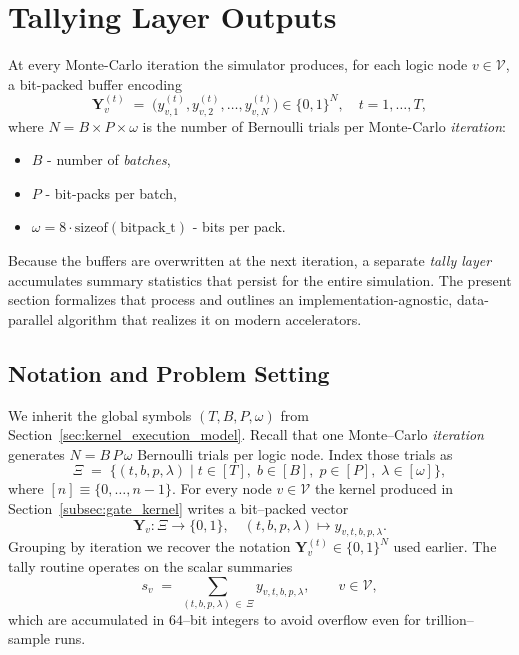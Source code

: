 \chapter{Tallying Layer Outputs}
\label{sec:tally_kernel}

At every Monte-Carlo iteration the simulator produces, for each logic node
\(v\in \mathcal{V}\), a bit-packed buffer encoding
\[
  \mathbf{Y}_v^{(t)}
  \;=\;
  \bigl(y_{v,1}^{(t)}, y_{v,2}^{(t)},\dots, y_{v,N}^{(t)}\bigr)
  \in\{0,1\}^N,
  \quad t = 1,\dots,T,
\]
where \(N\!=\!B\!\times\!P\!\times\!\omega\) is the number of Bernoulli trials
per Monte-Carlo \emph{iteration}:
\begin{itemize}
    \item \(B\) - number of \emph{batches},
    \item \(P\) - bit-packs per batch,
    \item \(\omega\!=\!8\cdot\mathrm{sizeof}(\text{bitpack\_t})\) - bits per pack.
\end{itemize}
Because the buffers are overwritten at the next iteration, a
separate \emph{tally layer} accumulates summary statistics that persist for the
entire simulation.  The present section formalizes that process and outlines
an implementation-agnostic, data-parallel algorithm that realizes it on modern
accelerators.

\section{Notation and Problem Setting}
\label{subsec:tally_notation}

We inherit the global symbols $(T,B,P,\omega)$ from
Section~\ref{sec:kernel_execution_model}.  Recall that one Monte--Carlo
\emph{iteration} generates $N\!=\!B\,P\,\omega$ Bernoulli trials per logic
node.  Index those trials as
\[
  \Xi \;=\; \bigl\{(t,b,p,\lambda) \mid t\!\in\![T],\; b\!\in\![B],\;
      p\!\in\![P],\; \lambda\!\in\![\omega]\bigr\},
\]
where $[n]\equiv\{0,\dots,n-1\}$.  For every node $v\in\mathcal{V}$ the
kernel produced in Section~\ref{subsec:gate_kernel} writes a bit--packed
vector
\[
  \mathbf{Y}_v : \Xi\longrightarrow \{0,1\}, \quad
  (t,b,p,\lambda) \mapsto y_{v,t,b,p,\lambda}.
\]
Grouping by iteration we recover the notation
\(\mathbf{Y}_v^{(t)}\in\{0,1\}^{N}\) used earlier.  The tally routine
operates on the scalar summaries
\[
  s_v \;=\; \sum_{(t,b,p,\lambda)\,\in\,\Xi} y_{v,t,b,p,\lambda},
  \qquad v\in\mathcal{V},
\]
which are accumulated in $64$--bit integers to avoid overflow even for
trillion--sample runs.

